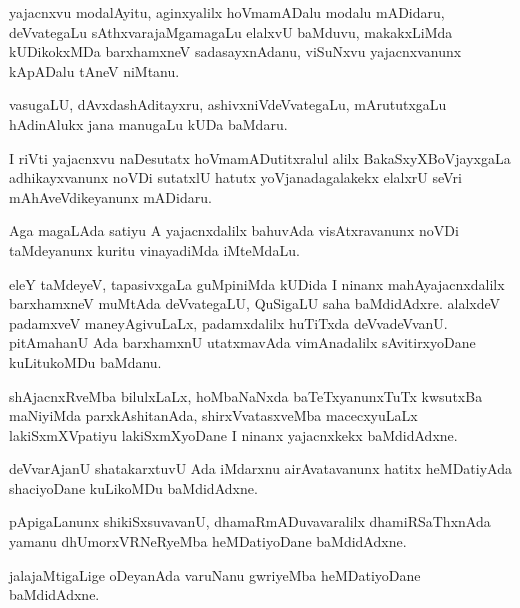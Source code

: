 \documentclass{article}
\begin{document}
\begin{mn}%
yajacnxvu modalAyitu, aginxyalilx hoVmamADalu modalu mADidaru,
deVvategaLu sAthxvarajaMgamagaLu elalxvU baMduvu, makakxLiMda
kUDikokxMDa barxhamxneV sadasayxnAdanu, viSuNxvu yajacnxvanunx
kApADalu tAneV niMtanu.
\end{mn}

\begin{mn}
vasugaLU, dAvxdashAditayxru, ashivxniVdeVvategaLu, mArututxgaLu
hAdinAlukx jana manugaLu kUDa baMdaru.
\end{mn}

\begin{mn}%
I riVti yajacnxvu naDesutatx hoVmamADutitxralul alilx
BakaSxyXBoVjayxgaLa adhikayxvanunx noVDi sutatxlU hatutx
yoVjanadagalakekx elalxrU seVri mAhAveVdikeyanunx mADidaru.
\end{mn}

\begin{mn}
Aga magaLAda satiyu A yajacnxdalilx bahuvAda visAtxravanunx noVDi
taMdeyanunx kuritu vinayadiMda iMteMdaLu.
\end{mn}

\begin{mn}%
eleY taMdeyeV, tapasivxgaLa guMpiniMda kUDida I ninanx
mahAyajacnxdalilx barxhamxneV muMtAda deVvategaLU, QuSigaLU saha
baMdidAdxre. alalxdeV padamxveV maneyAgivuLaLx, padamxdalilx huTiTxda
deVvadeVvanU. pitAmahanU Ada barxhamxnU utatxmavAda vimAnadalilx
sAvitirxyoDane kuLitukoMDu baMdanu.
\end{mn}

\begin{mn}%
shAjacnxRveMba bilulxLaLx, hoMbaNaNxda baTeTxyanunxTuTx kwsutxBa
maNiyiMda parxkAshitanAda, shirxVvatasxveMba macecxyuLaLx
lakiSxmXVpatiyu lakiSxmXyoDane I ninanx yajacnxkekx baMdidAdxne.
\end{mn}

\begin{mn}%
deVvarAjanU shatakarxtuvU Ada iMdarxnu airAvatavanunx hatitx
heMDatiyAda shaciyoDane kuLikoMDu baMdidAdxne.
\end{mn}

\begin{mn}
pApigaLanunx shikiSxsuvavanU, dhamaRmADuvavaralilx dhamiRSaThxnAda
yamanu dhUmorxVRNeRyeMba heMDatiyoDane baMdidAdxne.
\end{mn}

\begin{mn}
jalajaMtigaLige oDeyanAda varuNanu gwriyeMba heMDatiyoDane baMdidAdxne.
\end{mn}
\end{document}
